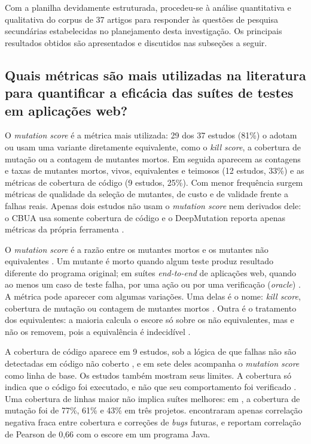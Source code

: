 Com a planilha devidamente estruturada, procedeu-se à análise quantitativa e qualitativa do corpus de 37 artigos para responder às questões de pesquisa secundárias estabelecidas no planejamento desta investigação. Os principais resultados obtidos são apresentados e discutidos nas subseções a seguir.

\subsection[Quais métricas são mais utilizadas na literatura?]{Quais métricas são mais utilizadas na literatura para quantificar
a eficácia das suítes de testes em aplicações web?}
\label{subsec:metricas-utilizadas}

O \textit{mutation score} é a métrica mais utilizada: 29 dos 37 estudos (81\%) o adotam ou usam uma variante diretamente equivalente, como o \textit{kill score}, a cobertura de mutação ou a contagem de mutantes mortos. Em seguida aparecem as contagens e taxas de mutantes mortos, vivos, equivalentes e teimosos (12 estudos, 33\%) e as métricas de cobertura de código (9 estudos, 25\%). Com menor frequência surgem métricas de qualidade da seleção de mutantes, de custo e de validade frente a falhas reais. Apenas dois estudos não usam o \textit{mutation score} nem derivados dele: o CBUA usa somente cobertura de código \cite{zhang2022} e o DeepMutation reporta apenas métricas da própria ferramenta \cite{tufano2020}.

O \textit{mutation score} é a razão entre os mutantes mortos e os mutantes não equivalentes \cite{chauhan2015, guerino2024}. Um mutante é morto quando algum teste produz resultado diferente do programa original; em suítes \textit{end-to-end} de aplicações web, quando ao menos um caso de teste falha, por uma ação ou por uma verificação (\textit{oracle}) \cite{yandrapally2021}. A métrica pode aparecer com algumas variações. Uma delas é o nome: \textit{kill score}, cobertura de mutação ou contagem de mutantes mortos \cite{inozemtseva2013, alenezi2016, dimov2010}. Outra é o tratamento dos equivalentes: a maioria calcula o escore só sobre os não equivalentes, mas  e  não os removem, pois a equivalência é indecidível \cite{yao2014}.

A cobertura de código aparece em 9 estudos, sob a lógica de que falhas não são detectadas em código não coberto \cite{zhang2022}, e em sete deles acompanha o \textit{mutation score} como linha de base. Os estudos também mostram seus limites. A cobertura só indica que o código foi executado, e não que seu comportamento foi verificado \cite{petrovic2021}. Uma cobertura de linhas maior não implica suítes melhores: em , a cobertura de mutação foi de 77\%, 61\% e 43\% em três projetos.  encontraram apenas correlação negativa fraca entre cobertura e correções de \textit{bugs} futuras, e  reportam correlação de Pearson de 0,66 com o escore em um programa Java.

